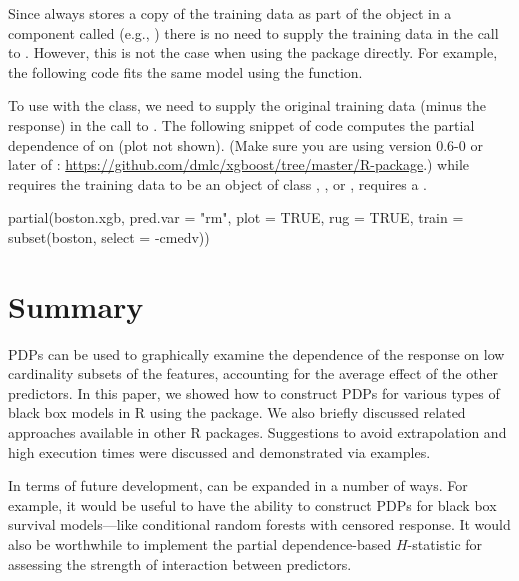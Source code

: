 Since  always stores a copy of the training data as part of the  object in a component called  (e.g., ) there is no need to supply the training data in the call to . However, this is not the case when using the  package directly. For example, the following code fits the same model using the  function.
To use  with the  class, we need to supply the original training data (minus the response) in the call to . The following snippet of code computes the partial dependence of  on  (plot not shown). (Make sure you are using version 0.6-0 or later of : \url{https://github.com/dmlc/xgboost/tree/master/R-package}.)  while  requires the training data to be an object of class , , or ,  requires a .
\begin{example}
partial(boston.xgb, pred.var = "rm", plot = TRUE, rug = TRUE,
        train = subset(boston, select = -cmedv))
\end{example}


\section{Summary}

PDPs can be used to graphically examine the dependence of the response on low cardinality subsets of the features, accounting for the average effect of the other predictors. In this paper, we showed how to construct PDPs for various types of black box models in R using the  package. We also briefly discussed related approaches available in other R packages. Suggestions to avoid extrapolation and high execution times were discussed and demonstrated via examples.

In terms of future development,  can be expanded in a number of ways. For example, it would be useful to have the ability to construct PDPs for black box survival models---like conditional random forests with censored response. It would also be worthwhile to implement the partial dependence-based $H$-statistic \citep{friedman-2008-predictive} for assessing the strength of interaction between predictors.


